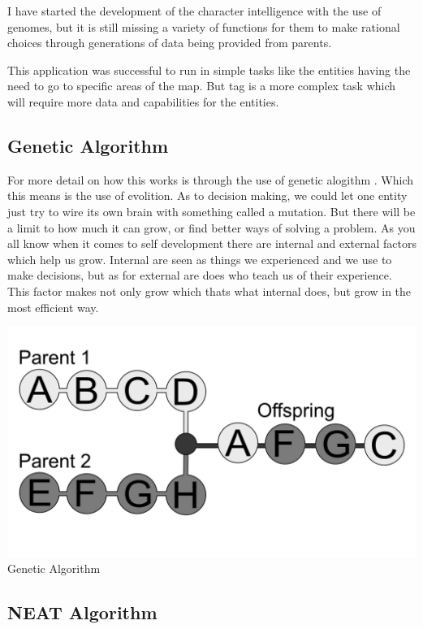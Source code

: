 \documentclass[10pt, letterpaper]{article}
\begin{document}
\begin{Form}
	I have started the development of the character intelligence with the use of genomes, but it is still missing
	a variety of functions for them to make rational choices through generations of data being provided from parents.

	This application was successful to run in simple tasks like the entities having the need to go to specific areas
	of the map. But tag is a more complex task which will require more data and capabilities for the entities.

	\subsection{Genetic Algorithm}

    For more detail on how this works is through the use of genetic alogithm \parencite{GeneticAlgorithm}. Which this means is the use of evolition.
	As to decision making, we could let one entity just try to wire its own brain with something called a mutation. But
	there will be a limit to how much it can grow, or find better ways of solving a problem. As you all know when it comes
	to self development there are internal and external factors which help us grow. Internal are seen as things we
	experienced and we use to make decisions, but as for external are does who teach us of their experience. This
	factor makes not only grow which thats what internal does, but grow in the most efficient way.

    \begin{center}
        \includegraphics[scale=0.15]{IMG/GeneticAlgorithm.png} \\
        Genetic Algorithm
    \end{center}

	\subsection{NEAT Algorithm}


\end{Form}
\end{document}
